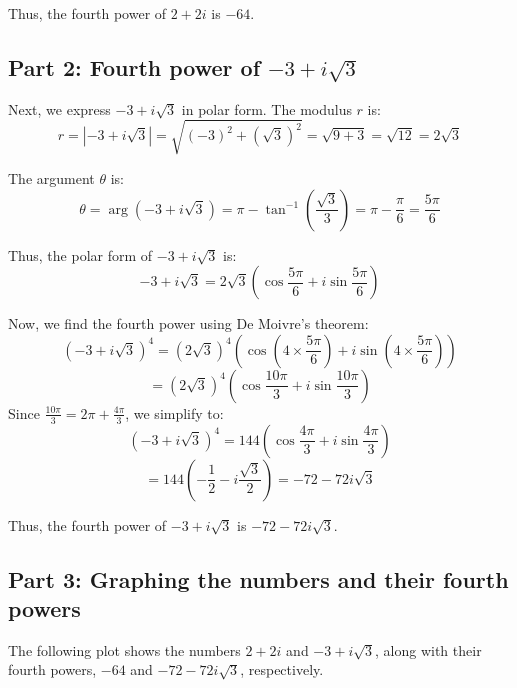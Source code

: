 \documentclass[11pt]{article}
\begin{document}
Thus, the fourth power of \( 2 + 2i \) is \( -64 \).

\newpage

\subsection{Part 2: Fourth power of \( -3 + i\sqrt{3} \)}

Next, we express \( -3 + i\sqrt{3} \) in polar form. The modulus \( r \) is:
\[
r = |-3 + i\sqrt{3}| = \sqrt{(-3)^2 + (\sqrt{3})^2} = \sqrt{9 + 3} = \sqrt{12} = 2\sqrt{3}
\]

The argument \( \theta \) is:
\[
\theta = \arg(-3 + i\sqrt{3}) = \pi - \tan^{-1}\left( \frac{\sqrt{3}}{3} \right) = \pi - \frac{\pi}{6} = \frac{5\pi}{6}
\]

Thus, the polar form of \( -3 + i\sqrt{3} \) is:
\[
-3 + i\sqrt{3} = 2\sqrt{3} \left( \cos\frac{5\pi}{6} + i \sin\frac{5\pi}{6} \right)
\]

Now, we find the fourth power using De Moivre's theorem:
\[
(-3 + i\sqrt{3})^4 = \left( 2\sqrt{3} \right)^4 \left( \cos\left( 4 \times \frac{5\pi}{6} \right) + i \sin\left( 4 \times \frac{5\pi}{6} \right) \right)
\]
\[
= (2\sqrt{3})^4 \left( \cos\frac{10\pi}{3} + i \sin\frac{10\pi}{3} \right)
\]
Since \( \frac{10\pi}{3} = 2\pi + \frac{4\pi}{3} \), we simplify to:
\[
(-3 + i\sqrt{3})^4 = 144 \left( \cos\frac{4\pi}{3} + i \sin\frac{4\pi}{3} \right)
\]
\[
= 144 \left( -\frac{1}{2} - i\frac{\sqrt{3}}{2} \right) = -72 - 72i\sqrt{3}
\]

Thus, the fourth power of \( -3 + i\sqrt{3} \) is \( -72 - 72i\sqrt{3} \).

\newpage

\subsection{Part 3: Graphing the numbers and their fourth powers}

The following plot shows the numbers \( 2 + 2i \) and \( -3 + i\sqrt{3} \), along with their fourth powers, \( -64 \) and \( -72 - 72i\sqrt{3} \), respectively.

\begin{center}
\end{center}
\end{document}
